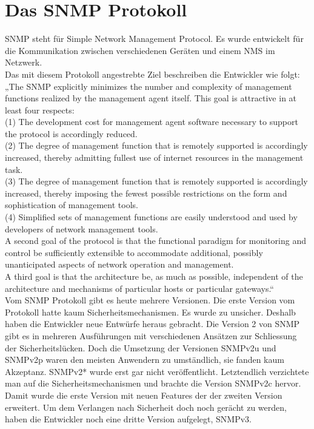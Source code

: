 \documentclass[11pt,a4paper]{article}
\begin{document}
\section{Das SNMP Protokoll}
SNMP steht für Simple Network Management Protocol. Es wurde entwickelt für die Kommunikation zwischen verschiedenen Geräten und einem NMS im Netzwerk.\\
\emptyline
Das mit diesem Protokoll angestrebte Ziel beschreiben die Entwickler wie folgt:\\
„The SNMP explicitly minimizes the number and complexity of management functions realized by the management agent itself.  This goal is attractive in at least four respects:\\
      (1)  The development cost for management agent software necessary to support the protocol is 	accordingly reduced.\\
      (2)  The degree of management function that is remotely supported is accordingly increased, 	thereby admitting fullest use of internet resources in the management task.\\
      (3)  The degree of management function that is remotely supported is accordingly increased, 	thereby imposing the fewest possible restrictions on the form and sophistication of 		management tools.\\
      (4)  Simplified sets of management functions are easily understood and used by developers of 	network management tools.\\
\emptyline
A second goal of the protocol is that the functional paradigm for monitoring and control be sufficiently extensible to accommodate additional, possibly unanticipated aspects of network operation and management.\\
\emptyline
A third goal is that the architecture be, as much as possible, independent of the architecture and mechanisms of particular hosts or particular gateways.“
\cite{rfcSnmpGoals}\\
\emptyline
Vom SNMP Protokoll gibt es heute mehrere Versionen. Die erste Version vom Protokoll hatte kaum Sicherheitsmechanismen. Es wurde zu unsicher. Deshalb haben die Entwickler neue Entwürfe heraus gebracht. Die Version 2 von SNMP gibt es in mehreren Ausführungen mit verschiedenen Ansätzen zur Schliessung der Sicherheitslücken. Doch die Umsetzung der Versionen SNMPv2u und SNMPv2p waren den meisten Anwendern zu umständlich, sie fanden kaum Akzeptanz. SNMPv2* wurde erst gar nicht veröffentlicht. Letztendlich verzichtete man auf die Sicherheitsmechanismen und brachte die Version SNMPv2c hervor. Damit wurde die erste Version mit neuen Features der der zweiten Version erweitert. Um dem Verlangen nach Sicherheit doch noch gerächt zu werden, haben die Entwickler noch eine dritte Version aufgelegt, SNMPv3.\\
\end{document}
